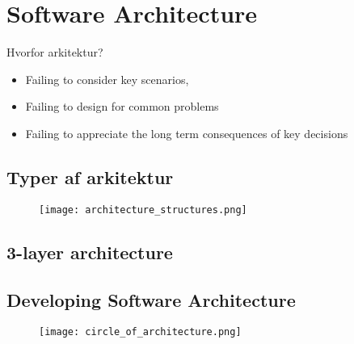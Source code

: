 \documentclass[../SWD_disp.tex]{subfiles}
\begin{document}
\section{Software Architecture}
Hvorfor arkitektur? 
\begin{itemize}
\item Failing to consider key scenarios,
\item Failing to design for common problems
\item Failing to appreciate the long term
consequences of key decisions 
\end{itemize}
\subsection{Typer af arkitektur}
\begin{figure}[H]
    \centering
    \texttt{[image: architecture\_structures.png]}
\end{figure}

\subsection{3-layer architecture}
\subsection{Developing Software Architecture}
\begin{figure}[H]
    \texttt{[image: circle\_of\_architecture.png]}
\end{figure}
\end{document}
